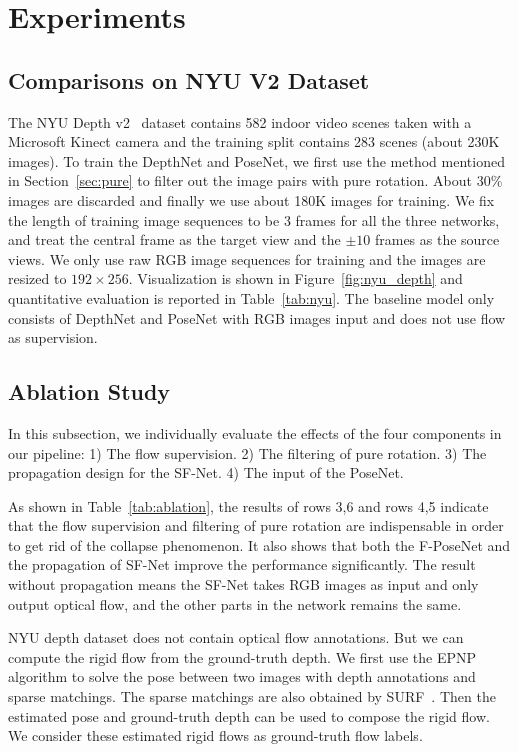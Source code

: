\documentclass[10pt,twocolumn,letterpaper]{article}
\begin{document}
\section{Experiments}

\subsection{Comparisons on NYU V2 Dataset}

The NYU Depth v2~\cite{silberman2012indoor} dataset contains 582 indoor video scenes taken with a Microsoft Kinect camera and the training split contains 283 scenes (about 230K images). To train the DepthNet and PoseNet, we first use the method mentioned in Section~\ref{sec:pure} to filter out the image pairs with pure rotation. About 30\% images are discarded and finally we use about 180K images for training. We fix the length of training image sequences to be 3 frames for all the three networks, and treat the central frame as the target view and the $\pm 10$ frames as the source views. We only use raw RGB image sequences for training and the images are resized to $192\times 256$. Visualization is shown in Figure~\ref{fig:nyu_depth} and quantitative evaluation is reported in Table~\ref{tab:nyu}. The baseline model only consists of DepthNet and PoseNet with RGB images input and does not use flow as supervision.  






\subsection{Ablation Study}

\label{abla}

In this subsection, we individually evaluate the effects of the four components in our pipeline: 1) The flow supervision. 2) The filtering of pure rotation.  3) The propagation design for the SF-Net. 4) The input of the PoseNet. 

As shown in Table~\ref{tab:ablation}, the results of rows 3,6 and rows 4,5 indicate that the flow supervision and filtering of pure rotation are indispensable in order to get rid of the collapse phenomenon. It also shows that both the F-PoseNet and the propagation of SF-Net improve the performance significantly. The result without propagation means the SF-Net takes RGB images as input and only output optical flow, and the other parts in the network remains the same.

NYU depth dataset does not contain optical flow annotations. But we can compute the rigid flow from the ground-truth depth. We first use the EPNP~\cite{lepetit2009epnp} algorithm to solve the pose between two images with depth annotations and sparse matchings. The sparse matchings are also obtained by SURF~\cite{bay2006surf}. Then the estimated pose and ground-truth depth can be used to compose the rigid flow. We consider these estimated rigid flows as ground-truth flow labels.  
\end{document}
